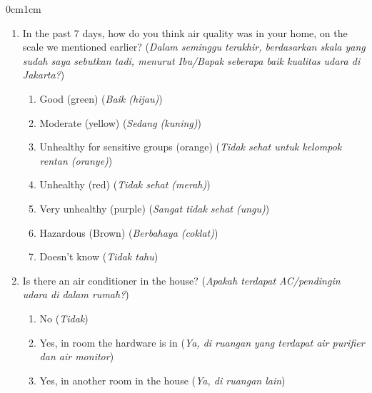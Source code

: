 \documentclass[9pt,twoside]{pnas-new}
\begin{document}
\begin{adjustwidth}{0cm}{1cm}
\begin{enumerate}
    \item In the past 7 days, how do you think air quality was in your home, on the scale we mentioned earlier? (\textit{Dalam seminggu terakhir, berdasarkan skala yang sudah saya sebutkan tadi, menurut Ibu/Bapak seberapa baik kualitas udara di Jakarta?})

    \begin{enumerate}
        \item Good (green) (\textit{Baik (hijau)})
        \item Moderate (yellow) (\textit{Sedang (kuning)})
        \item Unhealthy for sensitive groups (orange) (\textit{Tidak sehat untuk kelompok rentan (oranye)})
        \item Unhealthy (red) (\textit{Tidak sehat (merah)})
        \item Very unhealthy (purple) (\textit{Sangat tidak sehat (ungu)})
        \item Hazardous (Brown) (\textit{Berbahaya (coklat)})
        \item Doesn't know (\textit{Tidak tahu})
    \end{enumerate}

    
    \item Is there an air conditioner in the house? (\textit{Apakah terdapat AC/pendingin udara di dalam rumah?})
    \begin{enumerate}
        \item No (\textit{Tidak})
        \item Yes, in room the hardware is in (\textit{Ya, di ruangan yang terdapat air purifier dan air monitor})
        \item Yes, in another room in the house (\textit{Ya, di ruangan lain})
    \end{enumerate}
     

\end{enumerate}
\end{adjustwidth}
\end{document}
